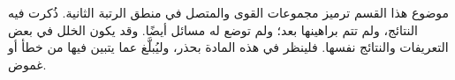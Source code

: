 \documentclass[../../../include/open-logic-chapter]{subfiles}
\begin{document}

\begin{editorial}
موضوع هذا القسم ترميز مجموعات القوى والمتصل في منطق الرتبة الثانية.
ذُكرت فيه النتائج، ولم تتم براهينها بعد؛ ولم توضع له مسائل أيضًا.
وقد يكون الخلل في بعض التعريفات والنتائج نفسها.
فلينظر في هذه المادة بحذر، وليُبلَّغ عما يتبين فيها من خطأ أو غموض.
\end{editorial}





\OLEndChapterHook
\end{document}
